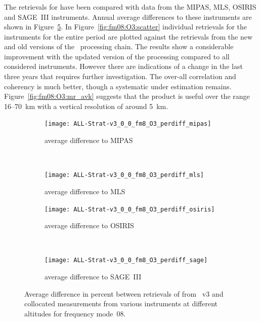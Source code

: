 
\subsubsection{}
\label{sec:fm08:comparison:O3}
The retrievals for  have been compared with data from the MIPAS, MLS,
OSIRIS and SAGE~III instruments. Annual average differences to these
instruments are shown in Figure~\ref{fig:fm08:O3:profiles}. In
Figure~\ref{fig:fm08:O3:scatter} individual retrievals for the instruments for
the entire period are plotted against the retrievals from the new and old
versions of the \smr\ processing chain. The results show a considerable
improvement with the updated version of the processing compared to all
considered instruments. However there are indications of a change in the last three years 
that requires further investigation. 
The over-all correlation and coherency is much better,
though a systematic under estimation remains.
Figure~\ref{fig:fm08:O3:mr_avk} suggests that the product is useful over the
range 16--70~km with a vertical resolution of around 5~km.

\begin{figure}[tbhp]
    \centering
    \begin{subfigure}[b]{0.49\textwidth}
        \texttt{[image: ALL-Strat-v3\_0\_0\_fm8\_O3\_perdiff\_mipas]}
        \caption{average difference to MIPAS}
        \label{fig:fm08:O3:profiles:MIPAS}
    \end{subfigure}
    \,
    \begin{subfigure}[b]{0.49\textwidth}
        \texttt{[image: ALL-Strat-v3\_0\_0\_fm8\_O3\_perdiff\_mls]}
        \caption{average difference to MLS}
        \label{fig:fm08:O3:profiles:MLS}
    \end{subfigure}

    \begin{subfigure}[b]{0.49\textwidth}
        \texttt{[image: ALL-Strat-v3\_0\_0\_fm8\_O3\_perdiff\_osiris]}
        \caption{average difference to OSIRIS}
        \label{fig:fm08:O3:profiles:OSIRIS}
    \end{subfigure}
    \,
    \begin{subfigure}[b]{0.49\textwidth}
        \texttt{[image: ALL-Strat-v3\_0\_0\_fm8\_O3\_perdiff\_sage]}
        \caption{average difference to SAGE~III}
        \label{fig:fm08:O3:profiles:SAGEIII}
    \end{subfigure}
    \caption{Average difference in percent between retrievals of 
    from \smr~v3 and collocated measurements from various instruments at
    different altitudes for frequency mode~08.}

    \label{fig:fm08:O3:profiles}
\end{figure}


